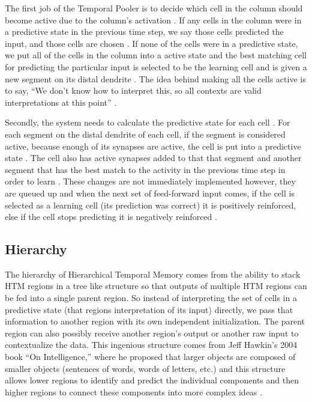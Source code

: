 \documentclass[fleqn,minimal]{article}
\begin{document}
	The first job of the Temporal Pooler is to decide which cell in the column should become active due to the column's activation \cite{Principles}. If any cells in the column were in a predictive state in the previous time step, we say those cells predicted the input, and those cells are chosen \cite{Whitepaper}. If none of the cells were in a predictive state, we put all of the cells in the column into a active state and the best matching cell for predicting the particular input is selected to be the learning cell and is given a new segment on its distal dendrite \cite{Whitepaper}. The idea behind making all the cells active is to say, ``We don't know how to interpret this, so all contexts are valid interpretations at this point'' \cite{Principles}.
	
	Secondly, the system needs to calculate the predictive state for each cell \cite{Whitepaper}. For each segment on the distal dendrite of each cell, if the segment is considered active, because enough of its synapses are active, the cell is put into a predictive state \cite{Principles}. The cell also has active synapses added to that that segment and another segment that has the best match to the activity in the previous time step in order to learn \cite{Whitepaper}. These changes are not immediately implemented however, they are queued up and when the next set of feed-forward input comes, if the cell is selected as a learning cell (its prediction was correct) it is positively reinforced, else if the cell stops predicting it is negatively reinforced \cite{Whitepaper}.
	
	\subsection{Hierarchy}
	
	The hierarchy of Hierarchical Temporal Memory comes from the ability to stack HTM regions in a tree like structure so that outputs of multiple HTM regions can be fed into a single parent region. So instead of interpreting the set of cells in a predictive state (that regions interpretation of its input) directly, we pass that information to another region with its own independent initialization. The parent region can also possibly receive another region's output or another raw input to contextualize the data. This ingenious structure comes from Jeff Hawkin's 2004 book ``On Intelligence,'' where he proposed that larger objects are composed of smaller objects (sentences of words, words of letters, etc.) and this structure allows lower regions to identify and predict the individual components and then higher regions to connect these components into more complex ideas \cite{Evaluation}.
	
\end{document}
